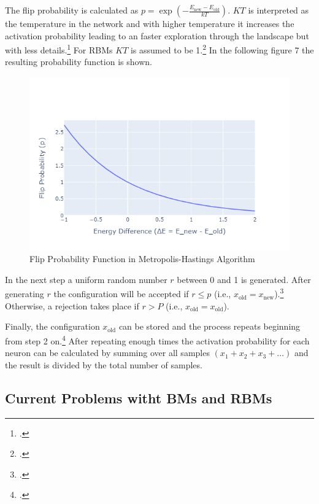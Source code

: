 The flip probability is calculated as $p=\exp\left(-\frac{E_{\text{new}}-E_{\text{old}}}{kT}\right)$.
\( KT \) is interpreted as the temperature in the network and with higher temperature it increases
the activation probability leading to an faster exploration through the landscape but with less details.\footcite[cf.][1-9]{liTemperatureBasedRestricted2016}
For \ac{RBM}s \( KT \) is assumed to be 1.\footcite[cf.][3]{hintonBoltzmannMachines2014} In the following figure 7 the resulting probability function is shown.

\begin{figure}[H]
    \centering
    \includegraphics[width=0.7\linewidth]{graphics/Flip Probability Function in Metropolis-Hastings Algorithm2.png}
    \caption{Flip Probability Function in Metropolis-Hastings Algorithm}
\end{figure}

In the next step a uniform random number $r$ between 0 and 1 is generated.
After generating $r$ the configuration will be accepted if $r \leq p$ (i.e., $x_{\text{old}}=x_{\text{new}}$).\footcite[cf.][2-3]{patronOptimalRelaxationRate2024}
Otherwise, a rejection takes place if $r > P$ (i.e., $x_{\text{old}}=x_{\text{old}}$).

Finally, the configuration $x_{\text{old}}$ can be stored and the process repeats beginning from step 2 on.\footcite[cf.][17]{patronOptimalRelaxationRate2024}
After repeating enough times the activation probability for each neuron can be calculated by summing over all samples $(x_1+x_2+x_3+\ldots)$ and the result is divided by the total number of samples.

\subsection{Current Problems witht BMs and RBMs}

